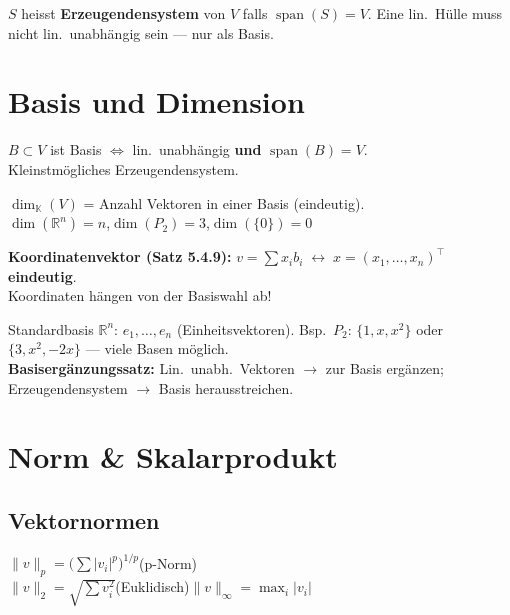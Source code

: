 \documentclass[10pt,a4paper,twocolumn]{article}
\newcommand{\seccol}{black}
\newcommand{\setseccol}[1]{\renewcommand{\seccol}{#1}}
\newcommand{\detail}[1]{{\small\color{detail}#1}}
\begin{document}
	\detail{$S$ heisst \textbf{Erzeugendensystem} von $V$ falls $\operatorname{span}(S)=V$. Eine lin.\ Hülle muss nicht lin.\ unabhängig sein — nur als Basis.}
	
	\setseccol{c3}
	\section{Basis und Dimension}
	
	\begin{tcolorbox}[defbox, title={Def. 5.4.1 — Basis}]
		$B\subset V$ ist Basis $\iff$ lin.\ unabhängig \textbf{und} $\operatorname{span}(B)=V$.\\
		Kleinstmögliches Erzeugendensystem.
	\end{tcolorbox}
	
	\begin{tcolorbox}[defbox, title={Def. 5.4.7 — Dimension}]
		$\dim_\mathbb{K}(V)$ = Anzahl Vektoren in einer Basis (eindeutig).\\
		$\dim(\mathbb{R}^n)=n$,\quad $\dim(P_2)=3$,\quad $\dim(\{0\})=0$
	\end{tcolorbox}
	
	\begin{tcolorbox}[tipbox]
		\textbf{Koordinatenvektor (Satz 5.4.9):}
		$v=\sum x_i b_i \;\leftrightarrow\; x=(x_1,\ldots,x_n)^\top$ \textbf{eindeutig}.\\
		Koordinaten hängen von der Basiswahl ab!
	\end{tcolorbox}
	
	\detail{Standardbasis $\mathbb{R}^n$: $e_1,\ldots,e_n$ (Einheitsvektoren). Bsp.\ $P_2$: $\{1,x,x^2\}$ oder $\{3,x^2,-2x\}$ — viele Basen möglich.\\
		\textbf{Basisergänzungssatz:} Lin.\ unabh.\ Vektoren $\to$ zur Basis ergänzen; Erzeugendensystem $\to$ Basis herausstreichen.}
	
	\setseccol{c4}
	\section{Norm \& Skalarprodukt}
	
	\subsection{Vektornormen}
	
	\begin{tcolorbox}[defbox, title={Normen}]
		$\|v\|_p=\bigl(\sum|v_i|^p\bigr)^{1/p}$\quad (p-Norm)\\
		$\|v\|_2=\sqrt{\sum v_i^2}$\quad (Euklidisch)\quad $\|v\|_\infty=\max_i|v_i|$
	\end{tcolorbox}
	
\end{document}
